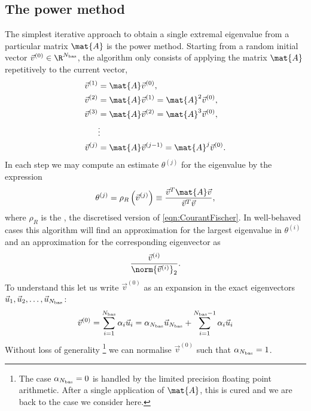 \subsection{The power method}
\label{sec:Power}
The simplest iterative approach to obtain a single extremal eigenvalue
from a particular matrix $\mat{A}$ is the power method.
Starting from a random initial vector $\vec{v}^{(0)} \in \R^{\Nbas}$,
the algorithm only consists of applying the matrix $\mat{A}$
repetitively to the current vector, \ie
\begin{equation}
\begin{aligned}
	\vec{v}^{(1)} &= \mat{A} \vec{v}^{(0)}, \\
	\vec{v}^{(2)} &= \mat{A} \vec{v}^{(1)} = \mat{A}^2 \vec{v}^{(0)}, \\
	\vec{v}^{(3)} &= \mat{A} \vec{v}^{(2)} = \mat{A}^3 \vec{v}^{(0)}, \\
	&\vdots \\
	\vec{v}^{(j)} &= \mat{A} \vec{v}^{(j-1)} = \mat{A}^j \vec{v}^{(0)}.
\end{aligned}
	\label{eqn:PowerScheme}
\end{equation}
In each step we may compute an estimate $\theta^{(j)}$ for the eigenvalue by
the expression
\begin{equation}
	\theta^{(j)} = \rho_R\left(\vec{v}^{(j)}\right) \equiv
	\frac{\vec{v}^T \mat{A} \vec{v}}{\vec{v}^T \vec{v}},
	\label{eqn:RayleighQuotient}
\end{equation}
where $\rho_R$ is the ,
the discretised version of \eqref{eqn:CourantFischer}.
In well-behaved cases this algorithm will find an approximation for
the largest eigenvalue in $\theta^{(i)}$
and an approximation for the corresponding eigenvector as
\[ \frac{\vec{v}^{(i)}}{\norm{\vec{v}^{(i)}}_2}. \]
To understand this
let us write $\vec{v}^{(0)}$ as an expansion in the exact
eigenvectors \linebreak $\vec{u}_1, \vec{u}_2, \ldots, \vec{u}_{N_\text{bas}}$:
\begin{equation}
	\vec{v}^{(0)} = \sum_{i=1}^{N_\text{bas}} \alpha_i \vec{u}_i = \alpha_{N_\text{bas}} \vec{u}_{N_\text{bas}} + \sum_{i=1}^{N_\text{bas}-1} \alpha_i \vec{u}_i
	\label{eqn:Vexpansion}
\end{equation}
Without loss of generality%
\footnote{The case $\alpha_{N_\text{bas}} = 0$ is handled by the limited precision
floating point arithmetic. After a single application of $\mat{A}$,
this is cured and we are back to the case we consider here.}
we can normalise $\vec{v}^{(0)}$ such that $\alpha_{N_\text{bas}} = 1$.
